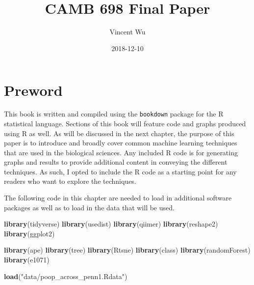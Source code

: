 \documentclass[12pt,openany]{book}
\title{CAMB 698 Final Paper}
\author{Vincent Wu}
\date{2018-12-10}
\newenvironment{Shaded}{\begin{snugshade}}{\end{snugshade}}
\newcommand{\KeywordTok}[1]{\textcolor[rgb]{0.13,0.29,0.53}{\textbf{#1}}}
\newcommand{\StringTok}[1]{\textcolor[rgb]{0.31,0.60,0.02}{#1}}
\newcommand{\NormalTok}[1]{#1}
\begin{document}
\maketitle

{
\setcounter{tocdepth}{1}
\tableofcontents
}
\chapter{Preword}\label{preword}

This book is written and compiled using the \texttt{bookdown} package
for the R statistical language. Sections of this book will feature code
and graphs produced using R as well. As will be discussed in the next
chapter, the purpose of this paper is to introduce and broadly cover
common machine learning techniques that are used in the biological
sciences. Any included R code is for generating graphs and results to
provide additional content in conveying the different techniques. As
such, I opted to include the R code as a starting point for any readers
who want to explore the techniques.

The following code in this chapter are needed to load in additional
software packages as well as to load in the data that will be used.

\begin{Shaded}
\begin{Highlighting}[]
\KeywordTok{library}\NormalTok{(tidyverse)}
\KeywordTok{library}\NormalTok{(usedist)}
\KeywordTok{library}\NormalTok{(qiimer)}
\KeywordTok{library}\NormalTok{(reshape2)}
\KeywordTok{library}\NormalTok{(ggplot2)}

\KeywordTok{library}\NormalTok{(ape)}
\KeywordTok{library}\NormalTok{(tree)}
\KeywordTok{library}\NormalTok{(Rtsne)}
\KeywordTok{library}\NormalTok{(class)}
\KeywordTok{library}\NormalTok{(randomForest)}
\KeywordTok{library}\NormalTok{(e1071)}
\end{Highlighting}
\end{Shaded}

\begin{Shaded}
\begin{Highlighting}[]
\KeywordTok{load}\NormalTok{(}\StringTok{"data/poop_across_penn1.Rdata"}\NormalTok{)}
\end{Highlighting}
\end{Shaded}
\end{document}
